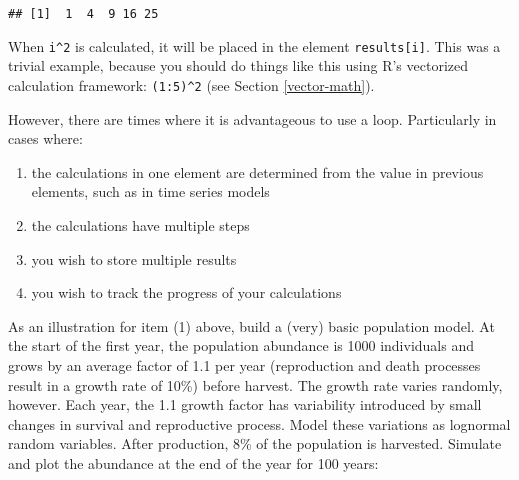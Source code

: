 \documentclass[]{book}
\providecommand{\tightlist}{%
  \setlength{\itemsep}{0pt}\setlength{\parskip}{0pt}}
\theoremstyle{definition}
\theoremstyle{definition}
\theoremstyle{definition}
\theoremstyle{remark}
\begin{document}
\begin{verbatim}
## [1]  1  4  9 16 25
\end{verbatim}

When \texttt{i\^{}2} is calculated, it will be placed in the element
\texttt{results{[}i{]}}. This was a trivial example, because you should
do things like this using R's vectorized calculation framework:
\texttt{(1:5)\^{}2} (see Section \ref{vector-math}).

However, there are times where it is advantageous to use a loop.
Particularly in cases where:

\begin{enumerate}
\def\labelenumi{\arabic{enumi}.}
\tightlist
\item
  the calculations in one element are determined from the value in
  previous elements, such as in time series models
\item
  the calculations have multiple steps
\item
  you wish to store multiple results
\item
  you wish to track the progress of your calculations
\end{enumerate}

As an illustration for item (1) above, build a (very) basic population
model. At the start of the first year, the population abundance is 1000
individuals and grows by an average factor of 1.1 per year (reproduction
and death processes result in a growth rate of 10\%) before harvest. The
growth rate varies randomly, however. Each year, the 1.1 growth factor
has variability introduced by small changes in survival and reproductive
process. Model these variations as lognormal random variables. After
production, 8\% of the population is harvested. Simulate and plot the
abundance at the end of the year for 100 years:
\end{document}
